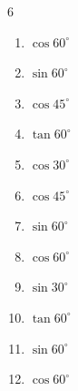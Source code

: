 \begin{multicols}{6}
\begin{enumerate}

  \item $\displaystyle \cos{60^\circ}$


  \item $\displaystyle \sin{60^\circ}$


  \item $\displaystyle \cos{45^\circ}$


  \item $\displaystyle \tan{60^\circ}$


  \item $\displaystyle \cos{30^\circ}$


  \item $\displaystyle \cos{45^\circ}$


  \item $\displaystyle \sin{60^\circ}$


  \item $\displaystyle \cos{60^\circ}$


  \item $\displaystyle \sin{30^\circ}$


  \item $\displaystyle \tan{60^\circ}$


  \item $\displaystyle \sin{60^\circ}$


  \item $\displaystyle \cos{60^\circ}$



\end{enumerate}
\end{multicols}

